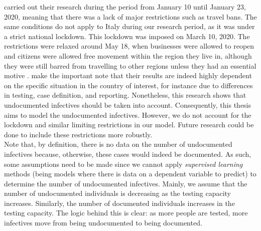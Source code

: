 \documentclass[12pt]{article}
\begin{document}
	\textcite{li2020undocumented} carried out their research during the period from January 10 until January 23, 2020, meaning that there was a lack of major restrictions such as travel bans. The same conditions do not apply to Italy during our research period, as it was under a strict national lockdown. This lockdown was imposed on March 10, 2020. The restrictions were relaxed around May 18, when businesses were allowed to reopen and citizens were allowed free movement within the region they live in, although they were still barred from travelling to other regions unless they had an essential motive \parencite{severgnini2020relaxLockdown}. \textcite{li2020undocumented} make the important note that their results are indeed highly dependent on the specific situation in the country of interest, for instance due to differences in testing, case definition, and reporting. Nonetheless, this research shows that undocumented infectives should be taken into account. Consequently, this thesis aims to model the undocumented infectives. However, we do not account for the lockdown and similar limiting restrictions in our model. Future research could be done to include these restrictions more robustly. \\
	
	Note that, by definition, there is no data on the number of undocumented infectives because, otherwise, these cases would indeed be documented. As such, some assumptions need to be made since we cannot apply \textit{supervised learning} methods (being models where there is data on a dependent variable to predict) to determine the number of undocumented infectives. Mainly, we assume that the number of undocumented individuals is decreasing as the testing capacity increases. Similarly, the number of documented individuals increases in the testing capacity. The logic behind this is clear: as more people are tested, more infectives move from being undocumented to being documented. \\
	
\end{document}
